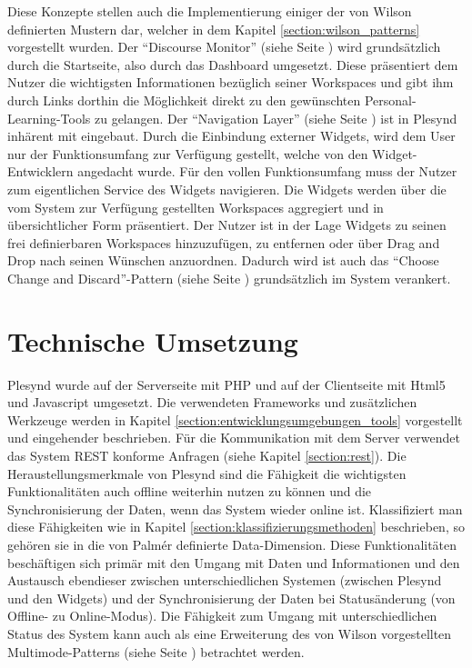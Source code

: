 Diese Konzepte stellen auch die Implementierung einiger der von Wilson definierten Mustern dar, welcher in dem Kapitel \ref{section:wilson_patterns} vorgestellt wurden.  Der "`Discourse Monitor"' (siehe Seite \pageref{wilson_patterns:discourse_monitor}) wird grundsätzlich durch die Startseite, also durch das Dashboard umgesetzt. Diese präsentiert dem Nutzer die wichtigsten Informationen bezüglich seiner Workspaces und gibt ihm durch Links dorthin die Möglichkeit direkt zu den gewünschten Personal-Learning-Tools zu gelangen. Der "`Navigation Layer"' (siehe Seite \pageref{wilson_patterns:navigation_layer}) ist in Plesynd inhärent mit eingebaut. Durch die Einbindung externer Widgets, wird dem User nur der Funktionsumfang zur Verfügung gestellt, welche von den Widget-Entwicklern angedacht wurde. Für den vollen Funktionsumfang muss der Nutzer zum eigentlichen Service des Widgets navigieren. Die Widgets werden über die vom System zur Verfügung gestellten Workspaces aggregiert und in übersichtlicher Form präsentiert. Der Nutzer ist in der Lage Widgets zu seinen frei definierbaren Workspaces hinzuzufügen, zu entfernen oder über Drag and Drop nach seinen Wünschen anzuordnen. Dadurch wird ist auch das "`Choose Change and Discard"'-Pattern (siehe Seite \pageref{wilson_patterns:choose_change_discard}) grundsätzlich im System verankert.

\section{Technische Umsetzung}\label{section:technische_umsetzung}
Plesynd wurde auf der Serverseite mit PHP und auf der Clientseite mit Html5 und Javascript umgesetzt. Die verwendeten Frameworks und zusätzlichen Werkzeuge werden in Kapitel \ref{section:entwicklungsumgebungen_tools} vorgestellt und eingehender beschrieben. Für die Kommunikation mit dem Server verwendet das System REST konforme Anfragen (siehe Kapitel \ref{section:rest}). 
Die Heraustellungsmerkmale von Plesynd sind die Fähigkeit die wichtigsten Funktionalitäten auch offline weiterhin nutzen zu können und die Synchronisierung der Daten, wenn das System wieder online ist. Klassifiziert man diese Fähigkeiten wie in Kapitel \ref{section:klassifizierungsmethoden} beschrieben, so gehören sie in die von Palmér definierte Data-Dimension. Diese Funktionalitäten beschäftigen sich primär mit den Umgang mit Daten und Informationen und den Austausch ebendieser zwischen unterschiedlichen Systemen (zwischen Plesynd und den Widgets) und der Synchronisierung der Daten bei Statusänderung (von Offline- zu Online-Modus). Die Fähigkeit zum Umgang mit unterschiedlichen Status des System kann auch als eine Erweiterung des von Wilson vorgestellten Multimode-Patterns (siehe Seite \pageref{wilson_patterns:multimode}) betrachtet werden. 


